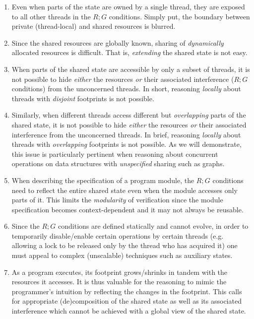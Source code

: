 \begin{enumerate}%
	\item Even when parts of the state are owned by a single thread, they are exposed to all other threads in the $R;G$ conditions. Simply put, the boundary between private (thread-local) and shared resources is blurred.
	
	\item Since the shared resources are globally known, sharing of \emph{dynamically} allocated resources is difficult. That is, \emph{extending} the shared state is not easy.
	
	\item When parts of the shared state are accessible by only a subset of threads, it is not possible to hide \emph{either} the resources \emph{or} their associated interference ($R;G$ conditions) from the unconcerned threads. In short, reasoning \emph{locally} about threads with \emph{disjoint} footprints is not possible.
	
	\item Similarly, when different threads access different but \emph{overlapping} parts of the shared state, it is not possible to hide \emph{either} the resources \emph{or} their associated interference from the unconcerned threads. In brief, reasoning \emph{locally} about threads with \emph{overlapping} footprints is not possible. As we will demonstrate, this issue is particularly pertinent when reasoning about concurrent operations on data structures with \emph{unspecified} sharing such as graphs. 
	
	\item When describing the specification of a program module, the $R;G$ conditions need to reflect the entire shared state even when the module accesses only parts of it. This limits the \emph{modularity} of verification since the module specification becomes context-dependent and it may not always be reusable.
	
	\item Since the $R;G$ conditions are defined statically and cannot evolve, in order to temporarily disable/enable certain operations by certain threads (e.g. allowing a lock to be released only by the thread who has acquired it) one must appeal to complex (unscalable) techniques such as auxiliary states. 
	
	\item As a program executes, its footprint grows/shrinks in tandem with the resources it accesses. It is thus valuable for the reasoning to mimic the programmer's intuition by reflecting the changes in the footprint. This calls for appropriate (de)composition of the shared state as well as its associated interference which cannot be achieved with a global view of the shared state. 
\end{enumerate}
